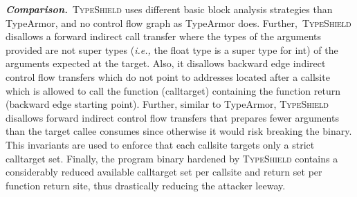 \textbf{\textit{Comparison.}}~\textsc{TypeShield} uses different basic block analysis strategies than TypeArmor,
and no control flow graph as TypeArmor does. Further,~\textsc{TypeShield}
disallows a forward indirect call transfer where the types of the arguments provided are not super 
types (\textit{i.e.,} the float type is a super type for int) of the arguments expected at the target. Also, it disallows backward edge indirect control flow transfers which do not 
point to addresses located after a callsite which is allowed to call the function (calltarget) containing the function 
return (backward edge starting point).
Further, similar to TypeArmor, \textsc{TypeShield} disallows forward indirect control flow transfers that 
prepares fewer arguments than the target callee consumes since otherwise it would risk breaking the binary.
This invariants are used to enforce that each callsite targets only a strict calltarget set.
Finally, the program binary hardened by \textsc{TypeShield} contains a considerably reduced available calltarget set per callsite 
and return set per function return site, thus drastically reducing the attacker leeway.

